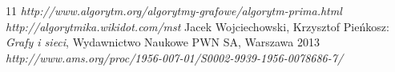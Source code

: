 


%
%

\listoffigures
\setcounter{secnumdepth}{-1}
\begin {thebibliography}{11}
 \emph{http://www.algorytm.org/algorytmy-grafowe/algorytm-prima.html}
\emph{http://algorytmika.wikidot.com/mst}
Jacek Wojciechowski, Krzysztof Pieńkosz: \emph{Grafy i sieci},  Wydawnictwo Naukowe PWN SA, Warszawa 2013
 \emph{http://www.ams.org/proc/1956-007-01/S0002-9939-1956-0078686-7/}
\end {thebibliography}

